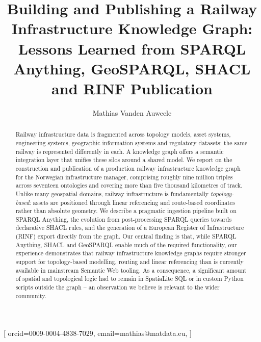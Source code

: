 \documentclass[twocolumn]{ceurart}
\begin{document}


\title{Building and Publishing a Railway Infrastructure Knowledge Graph:
  Lessons Learned from SPARQL Anything, GeoSPARQL, SHACL and RINF Publication}

\author[1]{Mathias Vanden Auweele}[
  orcid=0009-0004-4838-7029,
  email=mathias@matdata.eu,
]

\address[1]{Matdata, Belgium}
\address[2]{Bane NOR, Norway}


\begin{abstract}
  Railway infrastructure data is fragmented across topology models, asset
  systems, engineering systems, geographic information systems and regulatory
  datasets; the same railway is represented differently in each. A knowledge
  graph offers a semantic integration layer that unifies these silos around a
  shared model. We report on the construction and publication of a
  production railway infrastructure knowledge graph for the Norwegian
  infrastructure manager, comprising roughly nine million triples across
  seventeen ontologies and covering more than five thousand kilometres of
  track. Unlike many geospatial domains, railway infrastructure is
  fundamentally \emph{topology-based}: assets are positioned through linear
  referencing and route-based coordinates rather than absolute geometry. We
  describe a pragmatic ingestion pipeline built on SPARQL Anything, the
  evolution from post-processing SPARQL queries towards declarative SHACL
  rules, and the generation of a European Register of Infrastructure (RINF)
  export directly from the graph. Our central finding is that, while SPARQL
  Anything, SHACL and GeoSPARQL enable much of the required functionality, our
  experience demonstrates that railway infrastructure knowledge graphs require
  stronger support for topology-based modelling, routing and linear
  referencing than is currently available in mainstream Semantic Web tooling.
  As a consequence, a significant amount of spatial and topological logic had
  to remain in SpatiaLite SQL or in custom Python scripts outside the graph -- 
  an observation we believe is relevant to the wider community.
\end{abstract}
\end{document}

